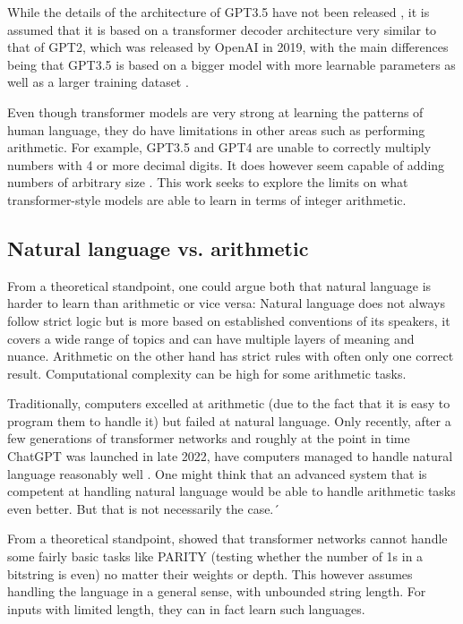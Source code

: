 While the details of the architecture of GPT3.5 have not been released \cite{openai_chatgpt_2022} \cite{openai2023gpt4}, it is assumed that it is based on a transformer decoder architecture very similar to that of GPT2, which was released by OpenAI in 2019, with the main differences being that GPT3.5 is based on a bigger model with more learnable parameters as well as a larger training dataset \cite{OpenGenus2023GPTComparison}.

Even though transformer models are very strong at learning the patterns of human language, they do have limitations in other areas such as performing arithmetic.
For example, GPT3.5 and GPT4 are unable to correctly multiply numbers with 4 or more decimal digits. It does however seem capable of adding numbers of arbitrary size \cite{openai2023gpt4} .  This work seeks to explore the limits on what transformer-style models are able to learn in terms of integer arithmetic.


\subsection{Natural language vs. arithmetic}

From a theoretical standpoint, one could argue both that natural language is harder to learn than arithmetic or vice versa:
Natural language does not always follow strict logic but is more based on established conventions of its speakers, it covers a wide range of topics and can have multiple layers of meaning and nuance.
Arithmetic on the other hand has strict rules with often only one correct result. Computational complexity can be high for some arithmetic tasks.

Traditionally, computers excelled at arithmetic (due to the fact that it is easy to program them to handle it) but failed at natural language.
Only recently, after a few generations of transformer networks and roughly at the point in time ChatGPT was launched in late 2022, have computers managed to handle natural language reasonably well \cite{tippingpoint}.
One might think that an advanced system that is competent at handling natural language would be able to handle arithmetic tasks even better. But that is not necessarily the case.´

From a theoretical standpoint, \cite{theoreticallimits} showed that transformer networks cannot handle some fairly basic tasks like PARITY (testing whether the number of 1s in a bitstring is even) no matter their weights or depth. This however assumes handling the language in a general sense, with unbounded string length. For inputs with limited length, they can in fact learn such languages.

